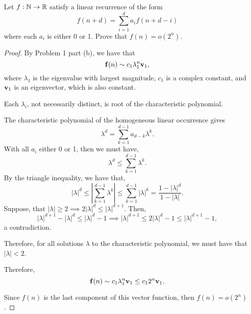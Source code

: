\documentclass[../hw1]{subfiles}
\begin{document}
\begin{problem}
Let $f:\N\to \R$ satisfy a linear recurrence of the form \[
	f(n+d)=\sum_{i=1}^{d} a_i f(n+d-i)
\]      where each $a_i$ is either 0 or 1.
Prove that  $f(n)=o(2^n)$.
\end{problem}
\begin{proof}
	By Problem 1 part (b), we have that \[
		\bf{f}(n)\sim c_1\lambda_1^n \bf{v}_1
		,\] where $\lambda_1$ is the eigenvalue with largest magnitude, $c_1$ is a complex constant, and $\bf{v}_1$ is an eigenvector, which is also constant.

	Each $\lambda_i$, not necessarily distinct, is root of the characteristic polynomial.

	The characteristic polynomial of the homogeneous linear occurrence gives \[
		\lambda^d = \sum_{k=1}^{d-1} a_{d-k} \lambda^{k}
		.\]
	With all $a_i$ either 0 or 1, then we must have,  \[
		\lambda^d \le \sum_{k=1}^{d-1} \lambda^{k}
		.\]
	By the triangle inequality, we have that,\[
		|\lambda|^d \le \left|  \sum_{k=1}^{d-1} \lambda^{k} \right| \le \sum_{k=1}^{d-1} |\lambda|^{k} = \frac{1- |\lambda|^d}{1- |\lambda|}
		.\]
	Suppose, that $|\lambda|\ge 2 \implies 2|\lambda|^d \le |\lambda|^{d+1}$.
	Then, \[
		|\lambda|^{d+1}-{|\lambda|}^d \le {|\lambda|}^d-1 \implies {|\lambda|}^{d+1} \le 2|\lambda|^d -1 \le {|\lambda|}^{d+1}-1
		,\] a contradiction.

	Therefore, for all solutions $\lambda$ to the characteristic polynomial, we must have that $|\lambda|<2$.

	Therefore,  \[
		\bf{f}(n)\sim c_1 \lambda_1^n \bf{v}_1 \le c_1 2^n \bf{v}_1
		.\]

	Since $f(n)$ is the last component of this vector function, then $f(n)=o(2^n)$.
\end{proof}
\end{document}
